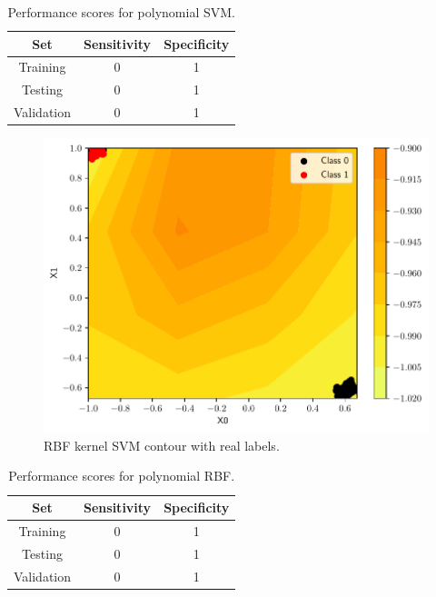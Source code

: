 \documentclass[conference]{IEEEtran}
\theoremstyle{definition}
\theoremstyle{remark}
\theoremstyle{remark}
\begin{document}
\begin{table}
\centering
\caption{Performance scores for polynomial SVM.}
\label{tab:poly_SVM_emb}
\begin{tabular}{ccc}
\hline
\textbf{Set} & \textbf{Sensitivity} & \textbf{Specificity} \\ \hline
Training & 0 & 1 \\
Testing & 0 & 1 \\
Validation & 0 & 1 \\ \hline
\end{tabular}
\end{table}

\begin{figure}
  \includegraphics[width=\columnwidth]{figs/svm-emb-rbf-contour-0-1.pdf}
  \caption{RBF kernel SVM contour with real labels.}
\end{figure}

\begin{table}
\centering
\caption{Performance scores for polynomial RBF.}
\label{tab:rbf_SVM_emb}
\begin{tabular}{ccc}
\hline
\textbf{Set} & \textbf{Sensitivity} & \textbf{Specificity} \\ \hline
Training & 0 & 1 \\
Testing & 0 & 1 \\
Validation & 0 & 1 \\ \hline
\end{tabular}
\end{table}
\end{document}
